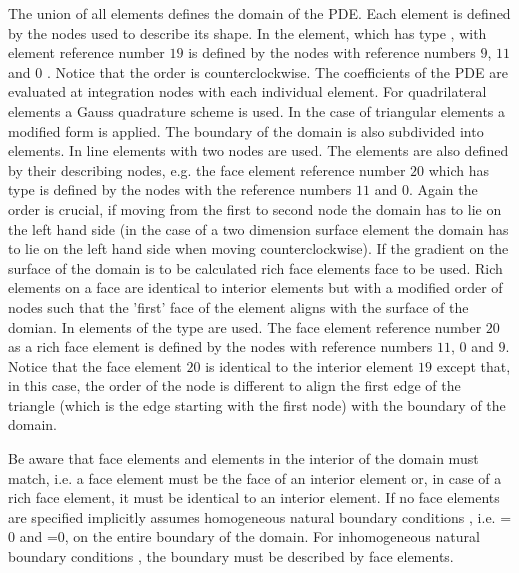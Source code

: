 The union of all elements defines the domain of the PDE.
Each element is defined by the nodes used to describe its shape. In  the element,
which has type ,
with element reference number $19$  is defined by the nodes
with reference numbers $9$, $11$ and $0$ . Notice that the order is counterclockwise. 
The coefficients of the PDE are evaluated at integration nodes with each individual element. 
For quadrilateral elements a Gauss quadrature scheme is used. In the case of triangular elements a 
modified form is applied. The boundary of the domain is also subdivided into elements.  In 
line elements with two nodes are used. The elements are also defined by their describing nodes, e.g.
the face element reference number $20$ which has type  is defined by the nodes
with the reference numbers $11$ and $0$. Again the order is crucial, if moving from the first
to second node the domain has to lie on the left hand side (in the case of a two dimension surface element
the domain has to lie on the left hand side when moving counterclockwise). If the gradient on the
surface of the domain is to be calculated rich face elements face to be used. Rich elements on a face
are identical to interior elements but with a modified order of nodes such that the 'first' face of the element aligns
with the surface of the domian. In 
elements of the type  are used. 
The face element reference number $20$ as a rich face element is defined by the nodes
with reference numbers $11$, $0$ and $9$. Notice that the face element $20$ is identical to the
interior element $19$ except that, in this case, the order of the node is different to align the first
edge of the triangle (which is the edge starting with the first node) with the boundary of the domain.

Be aware that face elements and elements in the interior of the domain must match, i.e. a face element must be the face
of an interior element or, in case of a rich face element, it must be identical to an interior element.
If no face elements are specified
\finley implicitly assumes homogeneous natural boundary conditions ,
i.e. =$0$ and =$0$, on the entire boundary of the domain. For  
inhomogeneous natural boundary conditions , 
the boundary must be described by face elements. 

